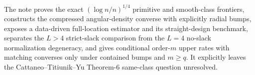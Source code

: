 The note proves the exact \((\log n/n)^{1/4}\) primitive and smooth-class frontiers, constructs the compressed angular-density converse with explicitly radial bumps, exposes a data-driven full-location estimator and its straight-design benchmark, separates the \(L>4\) strict-slack comparison from the \(L=4\) no-slack normalization degeneracy, and gives conditional order-\(m\) upper rates with matching converses only under contained bumps and \(m\geq q\).  It explicitly leaves the Cattaneo--Titiunik--Yu Theorem-6 same-class question unresolved.